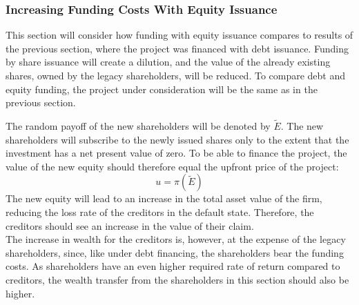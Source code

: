 \documentclass[main.tex]{subfiles}
\begin{document}
    \subsubsection{Increasing Funding Costs With Equity Issuance}
    \label{sec:example-equity-issuance}
        This section will consider how funding with equity issuance
        compares to results of the previous section, where the project was financed with debt issuance.
        Funding by share issuance will create a dilution, and the value of the already existing shares, owned by the legacy shareholders, will be reduced. 
        To compare debt and equity funding, 
        the project under consideration will be the same as in the previous section.

        The random payoff of the new shareholders will be denoted by $\tilde{E}$.
        The new shareholders will subscribe to the newly issued shares 
        only to the extent that the investment has a net present value of zero.
        To be able to finance the project, the value of the new equity
        should therefore equal the upfront price of the project:
        \begin{equation*}
            u = \pi(\tilde{E})
        \end{equation*}
        The new equity will lead to an increase in the total asset value of the firm,
        reducing the loss rate of the creditors in the default state.
        Therefore, the creditors should see an increase in the value of their claim.\\
        The increase in wealth for the creditors is, however, at the expense of the legacy shareholders,
        since, like under debt financing, the shareholders bear the funding costs.
        As shareholders have an even higher required rate of return compared to creditors,
        the wealth transfer from the shareholders in this section should also be higher.
\end{document}
